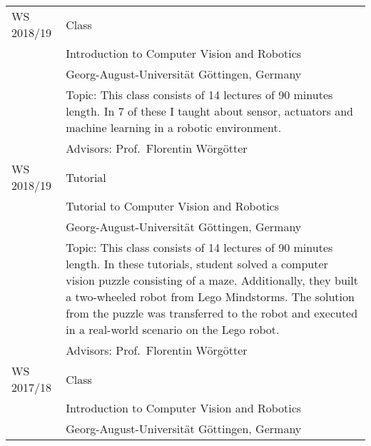 \hspace{0.5cm}\begin{tabular}{ p{2.5cm} p{10.3cm} }
  WS 2018/19    & Class\\
                & Introduction to Computer Vision and Robotics\\
                & Georg-August-Universit\"at G\"ottingen, Germany\\
                & Topic: This class consists of 14 lectures of 90 minutes length. In 7 of these I taught about sensor, actuators and machine learning in a robotic environment.\\
                & Advisors: Prof.~Florentin W\"org\"otter\vspace{0.5cm}\\
%
  WS 2018/19    & Tutorial\\
                & Tutorial to Computer Vision and Robotics\\
                & Georg-August-Universit\"at G\"ottingen, Germany\\
                & Topic: This class consists of 14 lectures of 90 minutes length. In these tutorials, student solved a computer vision puzzle consisting of a maze. Additionally, they built a two-wheeled robot from Lego Mindstorms. The solution from the puzzle was transferred to the robot and executed in a real-world scenario on the Lego robot.\\
                & Advisors: Prof.~Florentin W\"org\"otter\vspace{0.5cm}\\
%
  WS 2017/18    & Class\\
                & Introduction to Computer Vision and Robotics\\
                & Georg-August-Universit\"at G\"ottingen, Germany\\
\end{tabular}
\newpage
